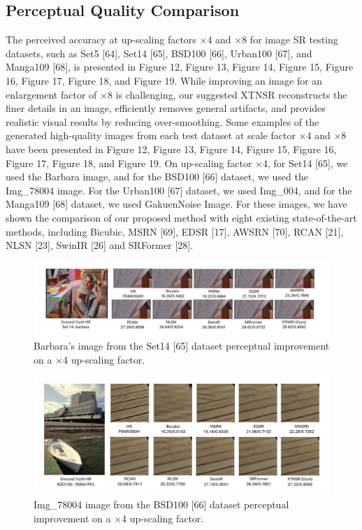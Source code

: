 \documentclass[twocolumn]{svjour3}          %
\begin{document}
\subsection{Perceptual Quality Comparison}
The perceived accuracy at up-scaling factors ×4 and ×8 for image SR testing datasets, such as Set5 [64], Set14 [65], BSD100 [66], Urban100 [67], and Manga109 [68], is presented in Figure 12, Figure 13, Figure 14, Figure 15, Figure 16, Figure 17, Figure 18, and Figure 19. While improving an image for an enlargement factor of ×8 is challenging, our suggested XTNSR reconstructs the finer details in an image, efficiently removes general artifacts, and provides realistic visual results by reducing over-smoothing. 
Some examples of the generated high-quality images from each test dataset at scale factor ×4 and ×8 have been presented in Figure 12, Figure 13, Figure 14, Figure 15, Figure 16, Figure 17, Figure 18, and Figure 19. On up-scaling factor ×4, for Set14 [65], we used the Barbara image, and for the BSD100 [66] dataset, we used the Img\_78004 image. For the Urban100 [67] dataset, we used Img\_004, and for the Manga109 [68] dataset, we used GakuenNoise Image. For these images, we have shown the comparison of our proposed method with eight existing state-of-the-art methods, including Bicubic, MSRN [69], EDSR [17], AWSRN [70], RCAN [21], NLSN [23], SwinIR [26] and SRFormer [28].

\begin{figure}
  \centering
  \includegraphics[width=\linewidth]{12FIGURE.pdf}
   \caption {Barbara's image from the Set14 [65] dataset perceptual improvement on a ×4 up-scaling factor.}
    \label{fig:12}
\end{figure}

\begin{figure}
  \centering
  \includegraphics[width=\linewidth]{13FIGURE.pdf}
   \caption {Img\_78004 image from the BSD100 [66] dataset perceptual improvement on a ×4 up-scaling factor.}
    \label{fig:13}
\end{figure}
\end{document}
